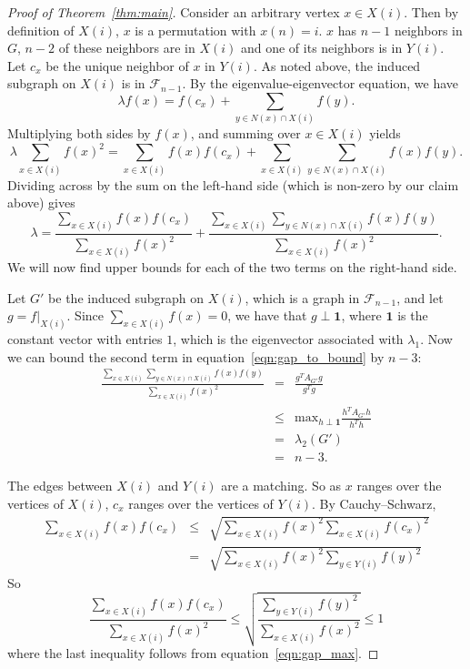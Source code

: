 \begin{proof}[Proof of Theorem~\ref{thm:main}]
  
  
  Consider an arbitrary vertex $x \in X(i)$.  Then by
  definition of $X(i)$, $x$
  is a permutation with $x(n) = i$.
  $x$ has $n-1$ neighbors in $G$, $n-2$ of these neighbors
  are in $X(i)$ and one of its neighbors is in $Y(i)$.
  Let $c_x$ be the unique neighbor of $x$ in $Y(i)$.
  As noted above, the induced subgraph on $X(i)$ is in $\mathcal{F}_{n-1}$.
  By the eigenvalue-eigenvector equation, we have
   \[ \lambda f(x) = f(c_x) + \sum_{y \in N(x) \cap X(i)} f(y) .\]
  Multiplying both sides by $f(x)$, and summing over $x \in X(i)$
  yields
   \[ \lambda \sum_{x \in X(i)} f(x)^2 = \sum_{x \in X(i)} f(x) f(c_x) + \sum_{x \in X(i)} \sum_{y \in N(x) \cap X(i)} f(x) f(y) .\]
  Dividing across by the sum on the left-hand side (which is non-zero 
  by our claim above) gives
   \begin{equation}\label{eqn:gap_to_bound}
     \lambda = \frac{\sum_{x \in X(i)} f(x) f(c_x)}{\sum_{x \in X(i)} f(x)^2} + \frac{\sum_{x \in X(i)} \sum_{y \in N(x) \cap X(i)} f(x) f(y)}{\sum_{x \in X(i)} f(x)^2} .
    \end{equation}
  We will now find upper bounds for each of the two terms on
  the right-hand side.
  
  Let ${G'}$ be the induced subgraph on $X(i)$, which is a graph in $\mathcal{F}_{n-1}$, and let
  $g = f|_{X(i)}$.
  Since $\sum_{x \in X(i)} f(x)=0$, we have that $g \perp \textbf{1}$, where $\textbf{1}$ is the constant vector with entries $1$,
  which is the eigenvector associated with $\lambda_1$.
  Now we can bound the second term in equation~\ref{eqn:gap_to_bound} by $n-3$:
     \begin{eqnarray*}
     \displaystyle \frac{\displaystyle\sum_{x \in X(i)} \displaystyle\sum_{y \in N(x) \cap X(i)} f(x) f(y)}{\displaystyle\sum_{x \in X(i)} f(x)^2} & = & \frac{g^T A_{G'} g}{ g^T g} \\
     &\leq& \text{max}_{h \perp \textbf{1}} \frac{h^T A_{G'} h}{h^T h} \\
     &=& \lambda_2(G') \\
     &=& n-3.
   \end{eqnarray*}
 
 



   The edges between $X(i)$ and $Y(i)$ are a matching.
  So as $x$ ranges over the vertices of $X(i)$, $c_x$ ranges over
  the vertices of $Y(i)$.  By Cauchy--Schwarz,
   \begin{eqnarray*} 
   \sum_{x \in X(i)}f(x) f(c_x) & \leq & \sqrt{\sum_{x \in X(i)}f(x)^2 \sum_{x \in X(i)}f(c_x)^2 } \\
   & = & \sqrt{\sum_{x \in X(i)}f(x)^2 \sum_{y \in Y(i)}f(y)^2 } 
   \end{eqnarray*}
  So
   \[ \frac{\displaystyle \sum_{x \in X(i)} f(x) f(c_x)}{\displaystyle \sum_{x \in X(i)} f(x)^2} \leq \sqrt{\frac{\displaystyle \sum_{y \in Y(i)}f(y)^2}{\displaystyle {\sum_{x \in X(i)}f(x)^2}}} \leq 1 \]
  where the last inequality follows from equation~\ref{eqn:gap_max}.
   

\end{proof}
